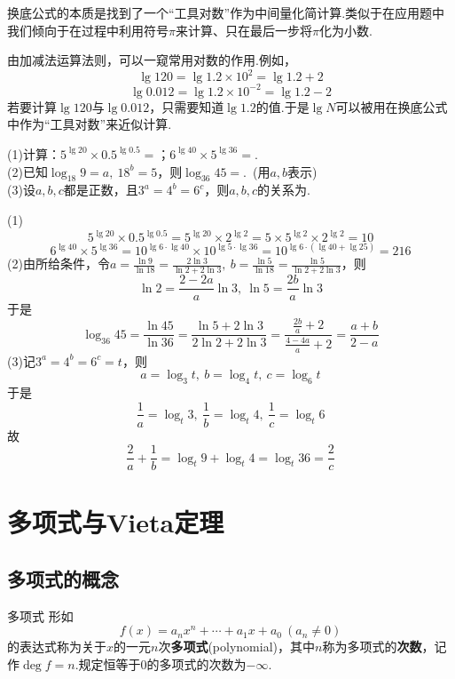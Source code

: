 \documentclass[lang=cn, zihao=5]{elegantbook}
\newcommand{\tk}{\uline{\hspace{4em}}}
\begin{document}
\begin{remark}
	换底公式的本质是找到了一个“工具对数”作为中间量化简计算.类似于在应用题中我们倾向于在过程中利用符号$\pi $来计算、只在最后一步将$\pi $化为小数.
\end{remark}
\begin{remark}
	由加减法运算法则，可以一窥常用对数的作用.例如，
	$$\lg{120} = \lg{1.2 \times 10^2} = \lg{1.2}+2$$
	$$\lg{0.012} = \lg{1.2 \times 10^{-2}} = \lg{1.2}-2$$
	若要计算$\lg{120}$与$\lg{0.012}$，只需要知道$\lg{1.2}$的值.于是$\lg{N}$可以被用在换底公式中作为“工具对数”来近似计算.
\end{remark}

\begin{example}
	(1)计算：$5^{\lg 20} \times 0.5^{\lg 0.5}=$\tk ；$6^{\lg 40} \times 5^{\lg 36}=$\tk . \\
	(2)已知$\log_{18}{9}=a,~18^b=5$，则$\log_{36}{45}=$\tk .~(用$a,b$表示) \\
	(3)设$a,b,c$都是正数，且$3^a=4^b=6^c$，则$a,b,c$的关系为\tk .
\end{example}
\begin{solution}
	(1)$$5^{\lg 20} \times 0.5^{\lg 0.5} = 5^{\lg 20} \times 2^{\lg 2} = 5 \times 5^{\lg 2} \times 2^{\lg 2} = 10$$
	$$6^{\lg 40} \times 5^{\lg 36} = 10^{\lg 6 \cdot \lg 40} \times 10^{\lg 5 \cdot \lg 36} = 10^{\lg 6 \cdot (\lg 40 + \lg 25)} = 216$$
	(2)由所给条件，令$a=\frac{\ln{9}}{\ln{18}}=\frac{2\ln{3}}{\ln{2}+2\ln{3}} ,~b=\frac{\ln{5}}{\ln{18}}=\frac{\ln{5}}{\ln{2}+2\ln{3}}$，则$$\ln{2}=\frac{2-2a}{a}\ln{3},~\ln{5}=\frac{2b}{a}\ln{3}$$
	于是
	$$\log_{36}{45} = \frac{\ln{45}}{\ln{36}} = \frac{\ln{5} + 2\ln{3}}{2\ln{2}+2\ln{3}} = \frac{\frac{2b}{a}+2}{\frac{4-4a}{a}+2} = \frac{a+b}{2-a}$$
	(3)记$3^a=4^b=6^c=t$，则$$a=\log_{3}{t},~b=\log_{4}{t},~c=\log_{6}{t}$$
	于是$$\frac{1}{a}=\log_{t}{3},~\frac{1}{b}=\log_{t}{4},~\frac{1}{c}=\log_{t}{6}$$
	故$$\frac{2}{a} + \frac{1}{b} = \log_{t}{9} + \log_{t}{4} = \log_{t}{36} = \frac{2}{c}$$
\end{solution}

\section{多项式与Vieta定理}

\subsection{多项式的概念}

\begin{definition}{多项式}
	形如$$f(x) = a_nx^n + \cdots + a_1x + a_0~(a_n \neq 0)$$的表达式称为关于$x$的一元$n$次\textbf{多项式}(polynomial)，其中$n$称为多项式的\textbf{次数}，记作$\deg f = n$.规定恒等于$0$的多项式的次数为$-\infty$.
\end{definition}
\end{document}
